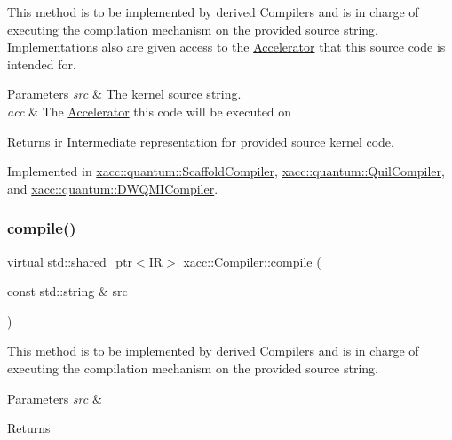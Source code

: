 This method is to be implemented by derived Compilers and is in charge of executing the compilation mechanism on the provided source string. Implementations also are given access to the \hyperlink{a01111}{Accelerator} that this source code is intended for.


\begin{DoxyParams}{Parameters}
{\em src} & The kernel source string. \\
\hline
{\em acc} & The \hyperlink{a01111}{Accelerator} this code will be executed on \\
\hline
\end{DoxyParams}
\begin{DoxyReturn}{Returns}
ir Intermediate representation for provided source kernel code. 
\end{DoxyReturn}


Implemented in \hyperlink{a00951_a7caede75bb2304ba405966651b115543}{xacc\+::quantum\+::\+Scaffold\+Compiler}, \hyperlink{a00931_a2421482415ca4e09963ea4ecddff8100}{xacc\+::quantum\+::\+Quil\+Compiler}, and \hyperlink{a00923_a0df05642f1a6fd44ce7f1c0396d50c9c}{xacc\+::quantum\+::\+D\+W\+Q\+M\+I\+Compiler}.

\mbox{\label{a01127_a9092f5f779b570c91569b59621280c04}} 
\subsubsection{\texorpdfstring{compile()}{compile()}\hspace{0.1cm}{\footnotesize\ttfamily [2/2]}}
{\footnotesize\ttfamily virtual std\+::shared\+\_\+ptr$<$\hyperlink{a01175}{IR}$>$ xacc\+::\+Compiler\+::compile (\begin{DoxyParamCaption}\item[{const std\+::string \&}]{src }\end{DoxyParamCaption})\hspace{0.3cm}{\ttfamily [pure virtual]}}

This method is to be implemented by derived Compilers and is in charge of executing the compilation mechanism on the provided source string. 
\begin{DoxyParams}{Parameters}
{\em src} & \\
\hline
\end{DoxyParams}
\begin{DoxyReturn}{Returns}

\end{DoxyReturn}


